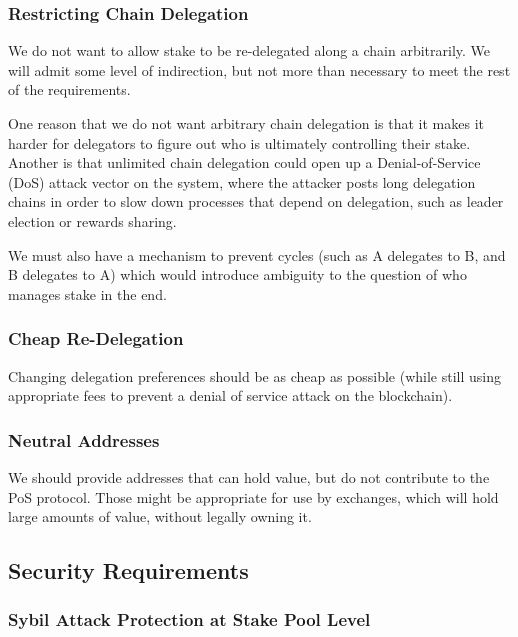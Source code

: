 \documentclass[11pt,a4paper]{article}
\begin{document}
\subsubsection{Restricting Chain
Delegation}\label{restricting-chain-delegation}

We do not want to allow stake to be re-delegated along a chain
arbitrarily. We will admit some level of indirection, but not more than
necessary to meet the rest of the requirements.

One reason that we do not want arbitrary chain delegation is that it
makes it harder for delegators to figure out who is ultimately
controlling their stake. Another is that unlimited chain delegation
could open up a Denial-of-Service (DoS) attack vector on the system,
where the attacker posts long delegation chains in order to slow down
processes that depend on delegation, such as leader election or rewards
sharing.

We must also have a mechanism to prevent cycles (such as A delegates to
B, and B delegates to A) which would introduce ambiguity to the question
of who manages stake in the end.

\subsubsection{Cheap Re-Delegation}\label{cheap-re-delegation}

Changing delegation preferences should be as cheap as possible (while
still using appropriate fees to prevent a denial of service attack on
the blockchain).

\subsubsection{Neutral Addresses}\label{neutral-addresses}

We should provide addresses that can hold value, but do not contribute
to the PoS protocol. Those might be appropriate for use by exchanges,
which will hold large amounts of value, without legally owning it.

\subsection{Security Requirements}\label{security-requirements}

\subsubsection{Sybil Attack Protection at Stake Pool
Level}\label{sybil-attack-protection-at-stake-pool-level}
\end{document}
